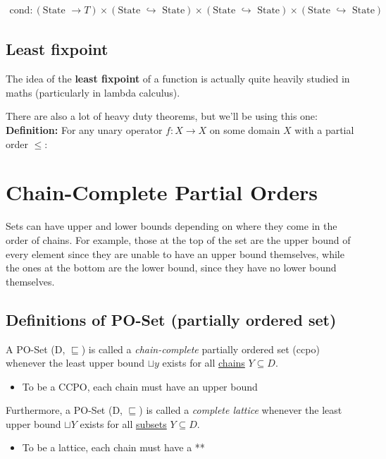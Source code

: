 \documentclass[11pt,a4paper,titlepage,dvipsnames,cmyk]{scrartcl}
\newcommand\pfun{\hookrightarrow}
\begin{document}
\begin{align*}
    \text{cond} : (\text{State } \rightarrow T) \times (\text{State }
    \pfun \text{ State}) \times (\text{State }
    \pfun \text{ State})\times (\text{State }
    \pfun \text{ State})
\end{align*}

\subsection{Least fixpoint}%
\label{sub:least-fixpoint}
The idea of the \textbf{least fixpoint} of a function is actually quite
heavily studied in maths (particularly in lambda calculus).

There are also a lot of heavy duty theorems, but we'll be using this one:
\textbf{Definition:} For any unary operator $f : X \rightarrow X$ on some
domain $X$ with a partial order $\le:$

\section{Chain-Complete Partial Orders}%
\label{sec:ccpo}

Sets can have upper and lower bounds depending on where they come in the
order of chains. For example, those at the top of the set are the upper
bound of every element since they are unable to have an upper bound
themselves, while the ones at the bottom are the lower bound, since they
have no lower bound themselves.

\subsection{Definitions of PO-Set (partially ordered set)}%
\label{sub:Definitions of PO-Set}
A PO-Set (D, $\sqsubseteq$) is called a \textit{chain-complete} partially
ordered set (ccpo) whenever the least upper bound $\sqcup y$ exists for
all \underline{chains} $Y \subseteq D$.
\begin{itemize}
    \item To be a CCPO, each chain must have an upper bound
\end{itemize}

Furthermore, a PO-Set (D, $\sqsubseteq$) is called a \textit{complete
lattice} whenever the least upper bound $\sqcup Y$ exists for all
\underline{subsets} $Y\subseteq D$.
\begin{itemize}
    \item To be a lattice, each chain must have a ** %
\end{itemize}
\end{document}
